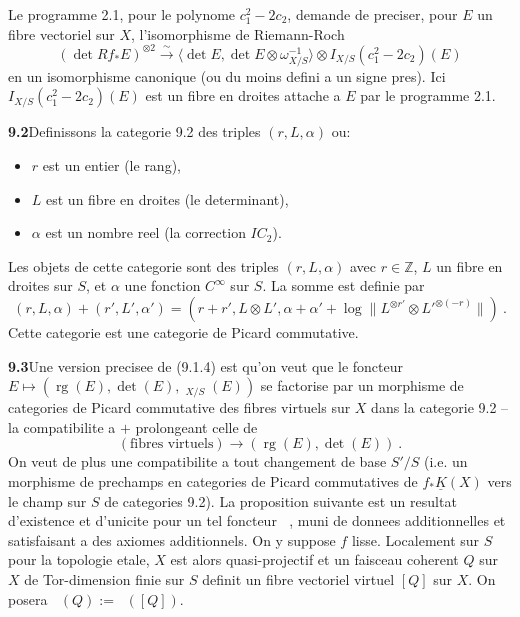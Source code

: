 \documentclass[12pt,a4paper]{article}
\theoremstyle{plain}
\theoremstyle{definition}
\theoremstyle{remark}
\newcommand{\bbZ}{\mathbb{Z}}
\DeclareMathOperator{\rg}{rg}
\DeclareMathOperator{\ICtwo}{IC_2}
\newcommand{\ubK}{\underline{K}}
\newcommand{\simto}{\xrightarrow{\sim}}
\begin{document}
Le programme 2.1, pour le polynome $c_1^2 - 2c_2$, demande de preciser, pour $E$ un fibre vectoriel sur $X$, l'isomorphisme de Riemann-Roch
\begin{equation}
\label{eq:9.1.1}
(\det Rf_* E)^{\otimes 2} \simto \langle \det E, \det E \otimes \omega_{X/S}^{-1} \rangle \otimes I_{X/S}(c_1^2 - 2c_2)(E)
\end{equation}
en un isomorphisme canonique (ou du moins defini a un signe pres). Ici $I_{X/S}(c_1^2 - 2c_2)(E)$ est un fibre en droites attache a $E$ par le programme 2.1.

\medskip
\noindent\textbf{9.2}\quad Definissons la categorie 9.2 des triples $(r, L, \alpha)$ ou:
\begin{itemize}
\item $r$ est un entier (le rang),
\item $L$ est un fibre en droites (le determinant),
\item $\alpha$ est un nombre reel (la correction $IC_2$).
\end{itemize}
Les objets de cette categorie sont des triples $(r, L, \alpha)$ avec $r \in \bbZ$, $L$ un fibre en droites sur $S$, et $\alpha$ une fonction $C^\infty$ sur $S$. La somme est definie par
\[
(r, L, \alpha) + (r', L', \alpha') = (r+r', L \otimes L', \alpha + \alpha' + \log\|L^{\otimes r'} \otimes L'^{\otimes (-r)}\|) \ .
\]
Cette categorie est une categorie de Picard commutative.

\medskip
\noindent\textbf{9.3}\quad Une version precisee de (9.1.4) est qu'on veut que le foncteur $E \mapsto (\rg(E), \det(E), \ICtwo_{X/S}(E))$ se factorise par un morphisme de categories de Picard commutative des fibres virtuels sur $X$ dans la categorie 9.2 -- la compatibilite a $+$ prolongeant celle de
\[
(\text{fibres virtuels}) \longrightarrow (\rg(E), \det(E)) \ .
\]
On veut de plus une compatibilite a tout changement de base $S'/S$ (i.e. un morphisme de prechamps en categories de Picard commutatives de $f_*\ubK(X)$ vers le champ sur $S$ de categories 9.2). La proposition suivante est un resultat d'existence et d'unicite pour un tel foncteur $\ICtwo$, muni de donnees additionnelles et satisfaisant a des axiomes additionnels. On y suppose $f$ lisse. Localement sur $S$ pour la topologie etale, $X$ est alors quasi-projectif et un faisceau coherent $Q$ sur $X$ de Tor-dimension finie sur $S$ definit un fibre vectoriel virtuel $[Q]$ sur $X$. On posera $\ICtwo(Q) := \ICtwo([Q])$.
\end{document}
